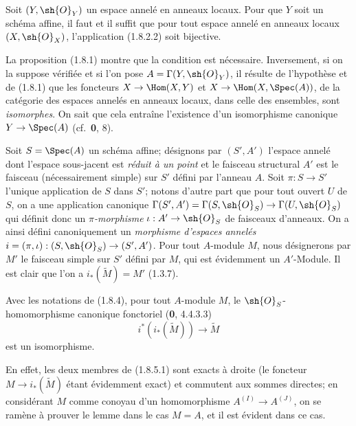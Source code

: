\begin{corollary}[1.8.3]
\label{ega2:addendum:I.1.8.3-fr}
Soit $(Y,\sh{O}_Y)$ un espace annelé en anneaux locaux. Pour que $Y$
soit un schéma affine, il faut et il suffit que pour tout espace annelé
en anneaux locaux $(X,\sh{O}_X)$, l'application \textup{(1.8.2.2)} soit
bijective.
\end{corollary}

La proposition (1.8.1) montre que la condition est nécessaire.
Inversement, si on la suppose vérifiée et si l'on pose
$A=\Gamma(Y,\sh{O}_Y)$, il résulte de l'hypothèse et de (1.8.1) que les
foncteurs $X\to\Hom(X,Y)$ et
$X\to\Hom(X,\Spec(A))$, de la catégorie des espaces annelés en
anneaux locaux, dans celle des ensembles, sont \emph{isomorphes}. On sait que
cela entraîne l'existence d'un isomorphisme canonique
$Y\to\Spec(A)$ (cf.~\textbf{0}, 8).

\begin{env}[1.8.4]
\label{ega2:addendum:I.1.8.4-fr}
Soit $S=\Spec(A)$ un schéma affine; désignons par $(S',A')$ l'espace
annelé dont l'espace sous-jacent est \emph{réduit à un point} et le faisceau
structural $A'$ est le faisceau (nécessairement simple) sur $S'$ défini
par l'anneau $A$. Soit $\pi:S\to S'$ l'unique application de $S$ dans
$S'$; notons d'autre part que pour tout ouvert $U$ de $S$, on a une
application canonique
$\Gamma(S',A')=\Gamma(S,\sh{O}_S)\to\Gamma(U,\sh{O}_S)$ qui définit
donc un \emph{$\pi$-morphisme} $\iota:A'\to\sh{O}_S$ de faisceaux d'anneaux.
On a ainsi défini canoniquement un \emph{morphisme d'espaces annelés}
$i=(\pi,\iota):(S,\sh{O}_S)\to(S',A')$. Pour tout $A$-module $M$, nous
désignerons par $M'$ le faisceau simple sur $S'$ défini par $M$, qui
est évidemment un $A'$-Module. Il est clair que l'on a
$i_*(\widetilde M)=M'$ (1.3.7).
\end{env}

\begin{lemma}[1.8.5]
\label{ega2:addendum:I.1.8.5-fr}
Avec les notations de \textup{(1.8.4)}, pour tout $A$-module $M$, le
$\sh{O}_S$-homomorphisme canonique fonctoriel \textup{(\textbf{0}, 4.4.3.3)}
\begin{equation}
\label{ega2:addendum:I.1.8.5.1-fr}
  i^*(i_*(\widetilde M))\to\widetilde M
\tag{1.8.5.1}
\end{equation}
est un isomorphisme.
\end{lemma}

En effet, les deux membres de (1.8.5.1) sont exacts à droite (le
foncteur $M\to i_*(\widetilde M)$ étant évidemment exact) et
commutent aux sommes directes; en considérant $M$ comme conoyau d'un
homomorphisme $A^{(I)}\to A^{(J)}$, on se ramène à prouver le lemme
dans le cas $M=A$, et il est évident dans ce cas.

